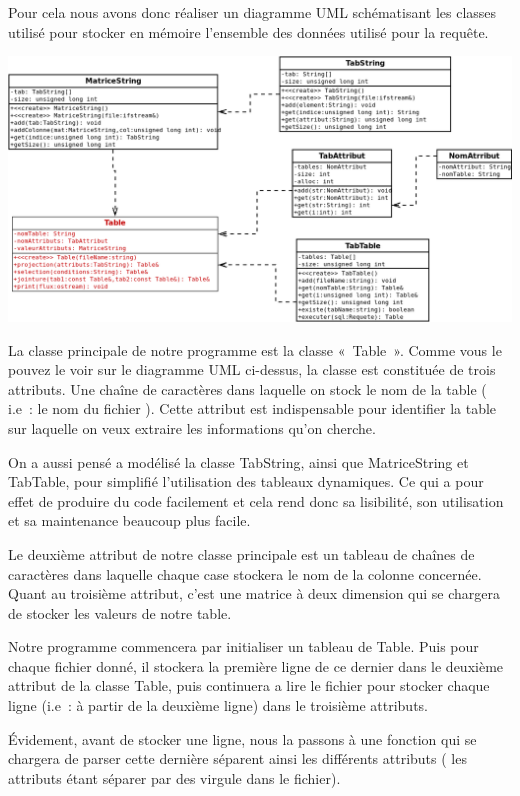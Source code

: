 \documentclass[oneside,13pt,a4paper]{report}
\begin{document}
Pour cela nous avons donc réaliser un diagramme UML schématisant les classes utilisé pour stocker en mémoire l’ensemble des données utilisé pour la requête.

\includegraphics[width=1\textwidth]{img/sql.png}\par

La classe principale de notre programme est la classe « Table ». Comme vous le pouvez le voir sur le diagramme UML ci-dessus, la classe est constituée de trois attributs. Une chaîne de caractères dans laquelle on stock le nom de la table ( i.e : le nom du fichier ). Cette attribut est indispensable pour identifier la table sur laquelle on veux extraire les informations qu’on cherche.

On a aussi pensé a modélisé la classe TabString, ainsi que MatriceString et TabTable, pour simplifié l’utilisation des tableaux dynamiques. Ce qui a pour effet de produire du code facilement et cela rend donc sa lisibilité, son utilisation et sa maintenance beaucoup plus facile.

Le deuxième attribut de notre classe principale est un tableau de chaînes de caractères dans laquelle chaque case stockera le nom de la colonne concernée. Quant au troisième attribut, c’est une matrice à deux dimension qui se chargera de stocker les valeurs de notre table.

Notre programme commencera par initialiser un tableau de Table. Puis pour chaque fichier donné, il stockera la première ligne de ce dernier dans le deuxième attribut de la classe Table, puis continuera a lire le fichier pour stocker chaque ligne (i.e : à partir de la deuxième ligne) dans le troisième attributs.

Évidement, avant de stocker une ligne, nous la passons à une fonction qui se chargera de parser cette dernière séparent ainsi les différents attributs ( les attributs étant séparer par des virgule dans le fichier).
\end{document}
